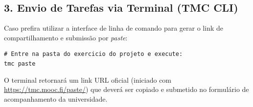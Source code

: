 \documentclass[11pt,a4paper]{article}
\begin{document}
\subsection*{3. Envio de Tarefas via Terminal (TMC CLI)}

Caso prefira utilizar a interface de linha de comando para gerar o link de compartilhamento e submissão por \emph{paste}:

\begin{solucao}
\begin{lstlisting}
# Entre na pasta do exercicio do projeto e execute:
tmc paste
\end{lstlisting}
\end{solucao}

O terminal retornará um link URL oficial (iniciado com \url{https://tmc.mooc.fi/paste/}) que deverá ser copiado e submetido no formulário de acompanhamento da universidade.
\end{document}
